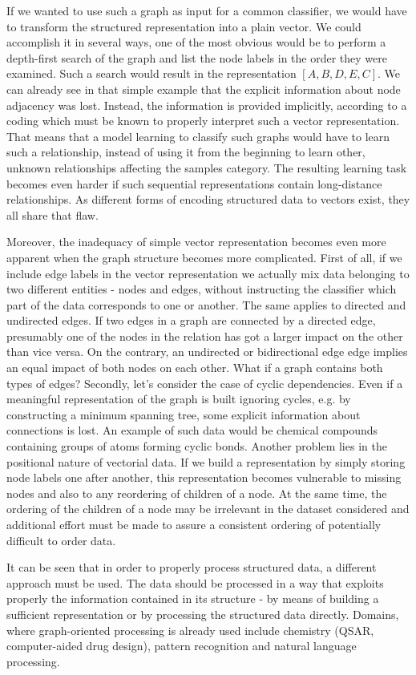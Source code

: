  If we wanted to use such a graph as input for a common classifier, we would have to transform the structured representation into a plain vector. We could accomplish it in several ways, one of the most obvious would be to perform a depth-first search of the graph and list the node labels in the order they were examined. Such a search would result in the representation $[A,B,D,E,C]$. We can already see in that simple example that the explicit information about node adjacency was lost. Instead, the information is provided implicitly, according to a coding which must be known to properly interpret such a vector representation. That means that a model learning to classify such graphs would have to learn such a relationship, instead of using it from the beginning to learn other, unknown relationships affecting the samples category. The resulting learning task becomes even harder if such sequential representations contain long-distance relationships. As different forms of encoding structured data to vectors exist, they all share that flaw.

Moreover, the inadequacy of simple vector representation becomes even more apparent when the graph structure becomes more complicated. First of all, if we include edge labels in the vector representation we actually mix data belonging to two different entities - nodes and edges, without instructing the classifier which part of the data corresponds to one or another. The same applies to directed and undirected edges. If two edges in a graph are connected by a directed edge, presumably one of the nodes in the relation has got a larger impact on the other than vice versa. On the contrary, an undirected or bidirectional edge edge implies an equal impact of both nodes on each other. What if a graph contains both types of edges? Secondly, let's consider the case of cyclic dependencies. Even if a meaningful representation of the graph is built ignoring cycles, e.g. by constructing a minimum spanning tree, some explicit information about connections is lost. An example of such data would be chemical compounds containing groups of atoms forming cyclic bonds. Another problem lies in the positional nature of vectorial data. If we build a representation by simply storing node labels one after another, this representation becomes vulnerable to missing nodes and also to any reordering of children of a node. At the same time, the ordering of the children of a node may be irrelevant in the dataset considered and additional effort must be made to assure a consistent ordering of potentially difficult to order data.

It can be seen that in order to properly process structured data, a different approach must be used. The data should be processed in a way that exploits properly the information contained in its structure - by means of building a sufficient representation or by processing the structured data directly. Domains, where graph-oriented processing is already used include chemistry (QSAR, computer-aided drug design), pattern recognition and natural language processing.






